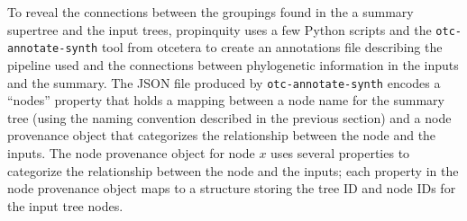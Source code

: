 \documentclass[fleqn,12pt,lineno,english]{wlpeerj}
\begin{document}
To reveal the connections between the groupings found in the a summary
supertree and the input trees, propinquity uses a few Python scripts
and the \texttt{otc-annotate-synth} tool from otcetera to create an
annotations file describing the pipeline used and the connections
between phylogenetic information in the inputs and the summary.  The
JSON file produced by \texttt{otc-annotate-synth} encodes a ``nodes''
property that holds a mapping between a node name for the summary
tree (using the naming convention described in the previous section)
and a node provenance object that categorizes the relationship between
the node and the inputs. The node provenance object for node $x$
uses several properties to categorize the relationship between the
node and the inputs; each property in the node provenance object maps
to a structure storing the tree ID and node IDs for the input tree
nodes. 
\end{document}
